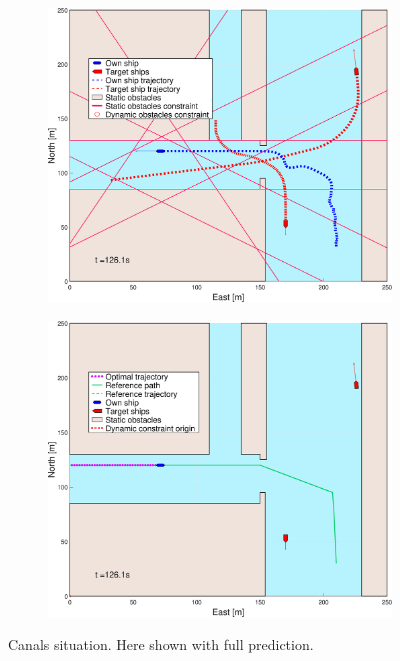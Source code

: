\begin{figure}[ht]
\begin{subfigure}[b]{0.494\textwidth}
        \subcaption{}
    \end{subfigure}
    \hfill
    \\ 
    \begin{subfigure}[b]{0.494\textwidth}
        \centering
        \includegraphics[width=\textwidth]{Images/Figures/Havn1/_Simple_0fig1_time=126}
        \subcaption{}
    \end{subfigure}
    \hfill
    \begin{subfigure}[b]{0.494\textwidth}
        \centering
        \includegraphics[width=\textwidth]{Images/Figures/Havn1/_Simple_0fig999_time=126}
        \subcaption{}
    \end{subfigure}
    \hfill
    \caption{Canals situation. Here shown with full prediction.}

\end{figure}
